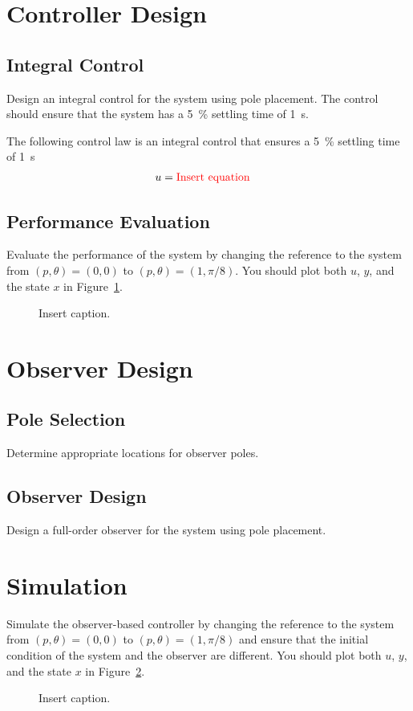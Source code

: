 \documentclass[a4paper,10pt,oneside]{article}
\begin{document}
\section{Controller Design}
\subsection{Integral Control}
{\color{red}Design an integral control for the system using pole placement. The control should ensure that the system has a 5~\% settling time of 1~s.}
\begin{tcolorbox}
The following control law is an integral control that ensures a 5~\% settling time of 1~s
\begin{align*}
u &= \text{\color{red}Insert equation}
\end{align*}
\end{tcolorbox}
\subsection{Performance Evaluation}
{\color{red} Evaluate the performance of the system by changing the reference to the system from $(p,\theta)=(0,0)$ to $(p,\theta)=(1,\pi/8)$. You should plot both $u$, $y$, and the state $x$ in Figure~\ref{fig:performanceEvaluation}.}
\begin{figure}[H]
\centering
{}
\caption{{\color{red}Insert caption}.}\label{fig:performanceEvaluation}
\end{figure}
\section{Observer Design}
\subsection{Pole Selection}
{\color{red} Determine appropriate locations for observer poles.}
\subsection{Observer Design}
{\color{red} Design a full-order observer for the system using pole placement.}
\section{Simulation}
{\color{red} Simulate the observer-based controller by changing the reference to the system from $(p,\theta)=(0,0)$ to $(p,\theta)=(1,\pi/8)$ and ensure that the initial condition of the system and the observer are different. You should plot both $u$, $y$, and the state $x$ in Figure~\ref{fig:simulation}.}
\begin{figure}[H]
\centering
{}
\caption{{\color{red}Insert caption}.}\label{fig:simulation}
\end{figure}
\end{document}
